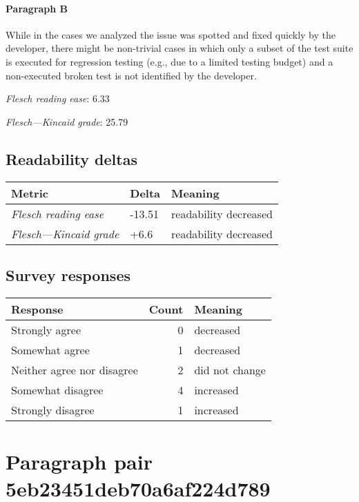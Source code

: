 \paragraph{Paragraph B}
While in the cases we analyzed the issue was spotted and fixed quickly by the developer, there might be non-trivial cases in which only a subset of the test suite is executed for regression testing (e.g., due to a limited testing budget) and a non-executed broken test is not identified by the developer.\par\medskip
\emph{Flesch reading ease}: 6.33\par
\emph{Flesch---Kincaid grade}: 25.79

\subsection{Readability deltas}

\begin{tabular}{lll}
\toprule
               \textbf{Metric} & \textbf{Delta} &       \textbf{Meaning} \\
\midrule
    \emph{Flesch reading ease} &         -13.51 &  readability decreased \\
 \emph{Flesch---Kincaid grade} &           +6.6 &  readability decreased \\
\bottomrule
\end{tabular}

\subsection{Survey responses}
\begin{tabular}{lrl}
\toprule
          \textbf{Response} &  \textbf{Count} & \textbf{Meaning} \\
\midrule
             Strongly agree &               0 &        decreased \\
             Somewhat agree &               1 &        decreased \\
 Neither agree nor disagree &               2 &   did not change \\
          Somewhat disagree &               4 &        increased \\
          Strongly disagree &               1 &        increased \\
\bottomrule
\end{tabular}

\section{Paragraph pair 5eb23451deb70a6af224d789}
